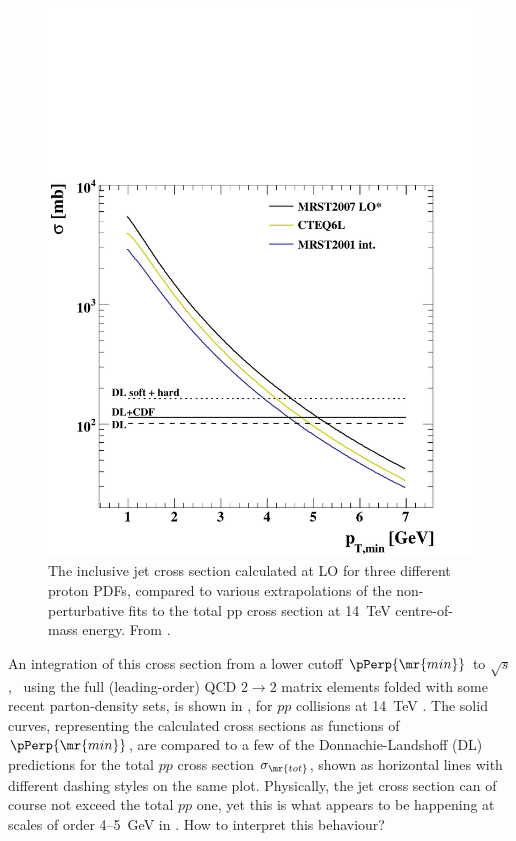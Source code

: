 \begin{figure}
\begin{center}
\vspace*{-30mm}\includegraphics*[scale=0.35]{minim-bias/qcd2to2}
\caption{The inclusive jet cross section calculated at LO for three
different proton PDFs, compared to various extrapolations
of the non-perturbative fits to the total pp
cross section at 14~TeV centre-of-mass
energy. From \cite{Bahr:2008wk}. \label{fig:sigma2to2}}
\end{center}
\end{figure}
An integration of this cross section from a lower cutoff
$\pPerp{\mr{min}}$ to $\sqrt{s}$, \
using the full (leading-order) QCD $2\to 2$ matrix elements
folded with some recent parton-density sets, is
shown in , for $pp$ collisions at 14~TeV
\cite{Bahr:2008wk}.
The solid curves, representing the calculated
cross sections as functions of $\pPerp{\mr{min}}$, are
compared to a few of the Donnachie-Landshoff (DL)
predictions \cite{Donnachie:1992ny,Donnachie:2004pi}
for the total $pp$ cross section $\sigma_{\mr{tot}}$,
shown as horizontal lines with  different dashing styles on the same
plot. Physically, the jet cross section can of course not
exceed the total $pp$ one, yet this is what appears to be happening
at scales of order 4--5~GeV in \FigRef{fig:sigma2to2}.
How to interpret this behaviour?

